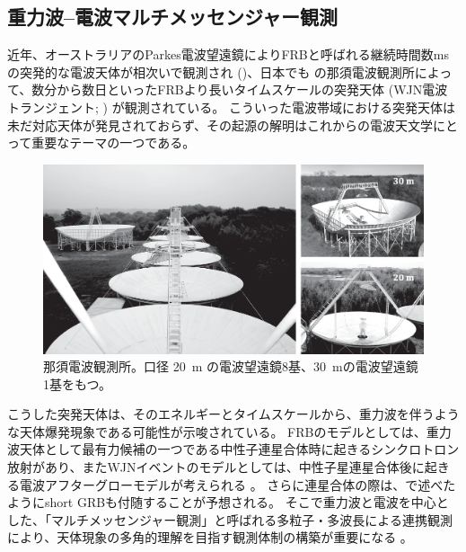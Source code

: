 
\subsection{重力波--電波マルチメッセンジャー観測} \label{transients.s3.gw}
近年、オーストラリアのParkes電波望遠鏡によりFRBと呼ばれる継続時間数msの突発的な電波天体が相次いで観測され ()、日本でも の那須電波観測所によって、数分から数日といったFRBより長いタイムスケールの突発天体 (WJN電波トランジェント; ) が観測されている。
こういった電波帯域における突発天体は未だ対応天体が発見されておらず、その起源の解明はこれからの電波天文学にとって重要なテーマの一つである。
\begin{figure}
	\centering
	\includegraphics[width=1\textwidth]{transients/transients.s3.gw.nasu.eps}
	\caption{那須電波観測所。口径 20~m の電波望遠鏡8基、30~mの電波望遠鏡1基をもつ。}
	\label{fig:transients.s3.gw.nasu}
\end{figure}%

こうした突発天体は、そのエネルギーとタイムスケールから、重力波を伴うような天体爆発現象である可能性が示唆されている。
FRBのモデルとしては、重力波天体として最有力候補の一つである中性子連星合体時に起きるシンクロトロン放射\citep{2013PASJ...65L..12T}があり、またWJNイベントのモデルとしては、中性子星連星合体後に起きる電波アフターグローモデルが考えられる \citep{2011Natur.478...82N}。
さらに連星合体の際は、で述べたようにshort GRBも付随することが予想される。
そこで重力波と電波を中心とした、「マルチメッセンジャー観測」と呼ばれる多粒子・多波長による連携観測により、天体現象の多角的理解を目指す観測体制の構築が重要になる \citep{2012IAUS..285..331H}。

